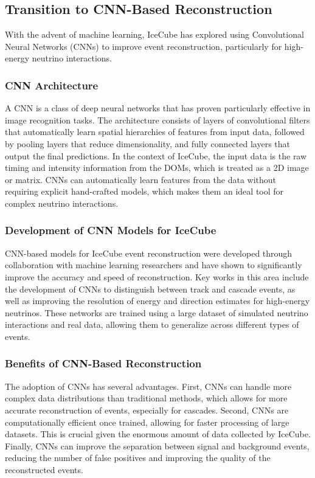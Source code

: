 \documentclass[a4paper,12pt,numbered]{article}
\begin{document}
\subsection{Transition to CNN-Based Reconstruction}
With the advent of machine learning, IceCube has explored using Convolutional Neural Networks (CNNs) to improve event reconstruction, particularly for high-energy neutrino interactions.

\subsubsection{CNN Architecture}
A CNN is a class of deep neural networks that has proven particularly effective in image recognition tasks. The architecture consists of layers of convolutional filters that automatically learn spatial hierarchies of features from input data, followed by pooling layers that reduce dimensionality, and fully connected layers that output the final predictions. In the context of IceCube, the input data is the raw timing and intensity information from the DOMs, which is treated as a 2D image or matrix. CNNs can automatically learn features from the data without requiring explicit hand-crafted models, which makes them an ideal tool for complex neutrino interactions.

\subsubsection{Development of CNN Models for IceCube}
CNN-based models for IceCube event reconstruction were developed through collaboration with machine learning researchers and have shown to significantly improve the accuracy and speed of reconstruction. Key works in this area include the development of CNNs to distinguish between track and cascade events, as well as improving the resolution of energy and direction estimates for high-energy neutrinos. These networks are trained using a large dataset of simulated neutrino interactions and real data, allowing them to generalize across different types of events.

\subsubsection{Benefits of CNN-Based Reconstruction}
The adoption of CNNs has several advantages. First, CNNs can handle more complex data distributions than traditional methods, which allows for more accurate reconstruction of events, especially for cascades. Second, CNNs are computationally efficient once trained, allowing for faster processing of large datasets. This is crucial given the enormous amount of data collected by IceCube. Finally, CNNs can improve the separation between signal and background events, reducing the number of false positives and improving the quality of the reconstructed events.
\end{document}
